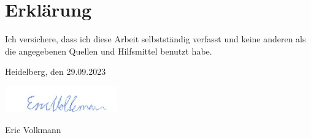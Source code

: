 \chapter*{Erkl\"{a}rung}

Ich versichere, dass ich diese Arbeit selbstst\"{a}ndig verfasst und keine anderen als die angegebenen Quellen und Hilfsmittel benutzt habe.
 
\vspace{2cm}
 
Heidelberg, den 29.09.2023

\includegraphics[height=3em]{Images/unterschrift.jpg}

Eric Volkmann

